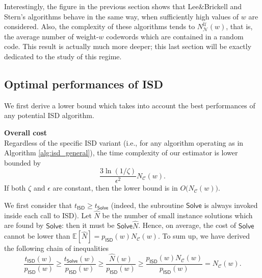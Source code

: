 Interestingly, the figure in the previous section shows that Lee\&Brickell and Stern's algorithms behave in the same way, when sufficiently high values of $w$ are considered.
Also, the complexity of these algorithms tends to $N_{\mathscr N}^{\mathcal U}(w)$, that is, the average number of weight-$w$ codewords which are contained in a random code.
This result is actually much more deeper; this last section will be exactly dedicated to the study of this regime.

\subsection{Optimal performances of ISD}

We first derive a lower bound which takes into account the best performances of any potential ISD algorithm.
\begin{proposition}\textbf{Overall cost}\\
Regardless of the specific ISD variant (i.e., for any algorithm operating as in Algorithm \ref{alg:isd_general}), the time complexity of our estimator is lower bounded by $$\frac{3\ln(1/\zeta)}{\epsilon^2}N_{\mathscr C}(w).$$
If both $\zeta$ and $\epsilon$ are constant, then the lower bound is in $O\big(N_{\mathscr C}(w)\big)$.
\end{proposition}
\begin{IEEEproof}
We first consider that $t_{\mathsf{ISD}}\geq t_{\mathsf{Solve}}$ (indeed, the subroutine $\mathsf{Solve}$ is always invoked inside each call to ISD).
Let $\widehat N$ be the number of small instance solutions which are found by $\mathsf{Solve}$: then it must be $\mathsf{Solve}\widehat N$.
Hence, on average, the cost of $\mathsf{Solve}$ cannot be lower than $\mathbb E[\widehat N] = p_{\mathsf{ISD}}(w) N_{\mathscr C}(w)$.
To sum up, we have derived the following chain of inequalities
$$\frac{t_{\mathsf{ISD}}(w)}{p_{\mathsf{ISD}}(w)}\geq \frac{t_{\mathsf{Solve}}(w)}{p_{\mathsf{ISD}}(w)}\geq\frac{\widehat N(w)}{p_{\mathsf{ISD}}(w)}\geq \frac{p_{\mathsf{ISD}}(w) N_{\mathscr C}(w)}{p_{\mathsf{ISD}}(w)} = N_{\mathscr C}(w).$$
\end{IEEEproof}
